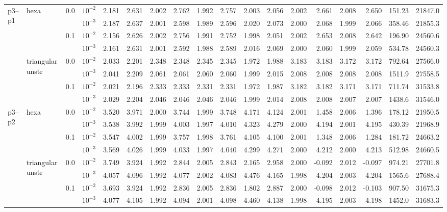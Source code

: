 \begin{longtable}{llclrrrrrrrrrrrrrr}
\multirow{8}{*}{p3--p1} & \multirow{4}{*}{hexa} & \multirow{2}{*}{0.0} & $10^{-2}$ & 2.181 & 2.631 & 2.002 & 2.762 & 1.992 & 2.757 & 2.003 & 2.056 & 2.002 & 2.661 & 2.008 & 2.650 & 151.23 & 21847.0 \\
& & & $10^{-3}$ & 2.187 & 2.637 & 2.001 & 2.598 & 1.989 & 2.596 & 2.020 & 2.073 & 2.000 & 2.068 & 1.999 & 2.066 & 358.46 & 21855.3 \\\cline{3-18}
& & \multirow{2}{*}{0.1} & $10^{-2}$ & 2.156 & 2.626 & 2.002 & 2.756 & 1.991 & 2.752 & 1.998 & 2.051 & 2.002 & 2.653 & 2.008 & 2.642 & 196.90 & 24560.6 \\
& & & $10^{-3}$ & 2.161 & 2.631 & 2.001 & 2.592 & 1.988 & 2.589 & 2.016 & 2.069 & 2.000 & 2.060 & 1.999 & 2.059 & 534.78 & 24560.3 \\\cline{2-18}
& \multirow{4}{*}{triangular unstr} & \multirow{2}{*}{0.0} & $10^{-2}$ & 2.033 & 2.201 & 2.348 & 2.348 & 2.345 & 2.345 & 1.972 & 1.988 & 3.183 & 3.183 & 3.172 & 3.172 & 792.64 & 27566.0 \\
& & & $10^{-3}$ & 2.041 & 2.209 & 2.061 & 2.061 & 2.060 & 2.060 & 1.999 & 2.015 & 2.008 & 2.008 & 2.008 & 2.008 & 1511.9 & 27558.5 \\\cline{3-18}
& & \multirow{2}{*}{0.1} & $10^{-2}$ & 2.021 & 2.196 & 2.333 & 2.333 & 2.331 & 2.331 & 1.972 & 1.987 & 3.182 & 3.182 & 3.171 & 3.171 & 711.74 & 31533.8 \\
& & & $10^{-3}$ & 2.029 & 2.204 & 2.046 & 2.046 & 2.046 & 2.046 & 1.999 & 2.014 & 2.008 & 2.008 & 2.007 & 2.007 & 1438.6 & 31546.0 \\\hline

\multirow{8}{*}{p3--p2} & \multirow{4}{*}{hexa} & \multirow{2}{*}{0.0} & $10^{-2}$ & 3.520 & 3.971 & 2.000 & 3.744 & 1.999 & 3.748 & 4.171 & 4.124 & 2.001 & 1.458 & 2.006 & 1.396 & 178.12 & 21950.5 \\
& & & $10^{-3}$ & 3.538 & 3.992 & 1.999 & 4.003 & 1.997 & 4.010 & 4.323 & 4.279 & 2.000 & 4.194 & 2.001 & 4.195 & 430.39 & 21968.9 \\\cline{3-18}
& & \multirow{2}{*}{0.1} & $10^{-2}$ & 3.547 & 4.002 & 1.999 & 3.757 & 1.998 & 3.761 & 4.105 & 4.100 & 2.001 & 1.348 & 2.006 & 1.284 & 181.72 & 24663.2 \\
& & & $10^{-3}$ & 3.569 & 4.026 & 1.999 & 4.033 & 1.997 & 4.040 & 4.299 & 4.271 & 2.000 & 4.212 & 2.000 & 4.213 & 512.98 & 24660.5 \\\cline{2-18}
& \multirow{4}{*}{triangular unstr} & \multirow{2}{*}{0.0} & $10^{-2}$ & 3.749 & 3.924 & 1.992 & 2.844 & 2.005 & 2.843 & 2.165 & 2.958 & 2.000 & -0.092 & 2.012 & -0.097 & 974.21 & 27701.8 \\
& & & $10^{-3}$ & 4.057 & 4.096 & 1.992 & 4.077 & 2.002 & 4.083 & 4.476 & 4.165 & 1.998 & 4.204 & 2.003 & 4.204 & 1565.6 & 27688.4 \\\cline{3-18}
& & \multirow{2}{*}{0.1} & $10^{-2}$ & 3.693 & 3.924 & 1.992 & 2.836 & 2.005 & 2.836 & 1.802 & 2.887 & 2.000 & -0.098 & 2.012 & -0.103 & 907.50 & 31675.3 \\
& & & $10^{-3}$ & 4.077 & 4.105 & 1.992 & 4.094 & 2.001 & 4.098 & 4.460 & 4.138 & 1.998 & 4.195 & 2.003 & 4.198 & 1452.0 & 31683.3 \\\hline


\end{longtable}
